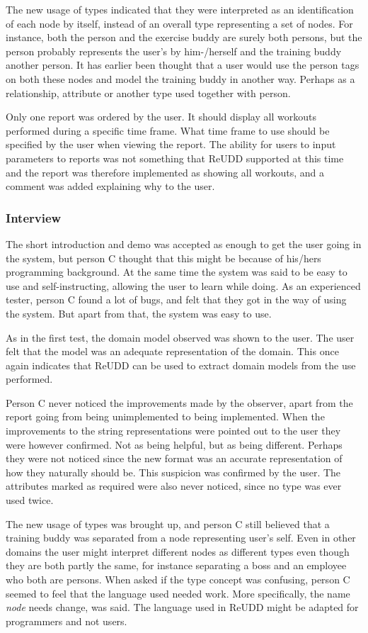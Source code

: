 \documentclass[a4paper]{report}
\begin{document}
The new usage of types indicated that they were interpreted as an identification of each node by itself, instead of an overall type representing a set of nodes. For instance, both the person and the exercise buddy are surely both persons, but the person probably represents the user's by him-/herself and the training buddy another person. It has earlier been thought that a user would use the person tags on both these nodes and model the training buddy in another way. Perhaps as a relationship, attribute or another type used together with person.

Only one report was ordered by the user. It should display all workouts performed during a specific time frame. What time frame to use should be specified by the user when viewing the report. The ability for users to input parameters to reports was not something that ReUDD supported at this time and the report was therefore implemented as showing all workouts, and a comment was added explaining why to the user.

\subsubsection{Interview}
The short introduction and demo was accepted as enough to get the user going in the system, but person C thought that this might be because of his/hers programming background. At the same time the system was said to be easy to use and self-instructing, allowing the user to learn while doing. As an experienced tester, person C found a lot of bugs, and felt that they got in the way of using the system. But apart from that, the system was easy to use.

As in the first test, the domain model observed was shown to the user. The user felt that the model was an adequate representation of the domain. This once again indicates that ReUDD can be used to extract domain models from the use performed.

Person C never noticed the improvements made by the observer, apart from the report going from being unimplemented to being implemented. When the improvements to the string representations were pointed out to the user they were however confirmed. Not as being helpful, but as being different. Perhaps they were not noticed since the new format was an accurate representation of how they naturally should be. This suspicion was confirmed by the user. The attributes marked as required were also never noticed, since no type was ever used twice.

The new usage of types was brought up, and person C still believed that a training buddy was separated from a node representing user's self. Even in other domains the user might interpret different nodes as different types even though they are both partly the same, for instance separating a boss and an employee who both are persons. When asked if the type concept was confusing, person C seemed to feel that the language used needed work. More specifically, the name \emph{node} needs change, was said. The language used in ReUDD might be adapted for programmers and not users.
\end{document}
